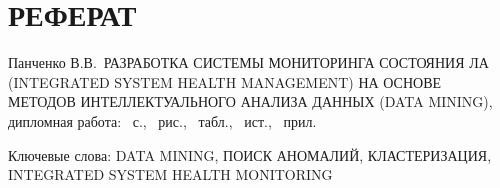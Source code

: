 \newcommand{\thesistitle}{Разработка системы мониторинга состояния ЛА (Integrated System Health Management) на основе методов интеллектуального анализа данных (Data Mining)}
\newcommand{\thesisauthor}{Панченко В.В.}
\newcommand{\thesiskeywords}{Data Mining, поиск аномалий, кластеризация, Integrated System Health Monitoring}

\chapter*{\MakeUppercase{Реферат}}
\sloppy
{
\thesisauthor\ \MakeUppercase{\thesistitle}, дипломная работа: \pagecount~с., ~рис., ~табл., ~ист., ~прил.

Ключевые слова: \MakeUppercase{\thesiskeywords}
}